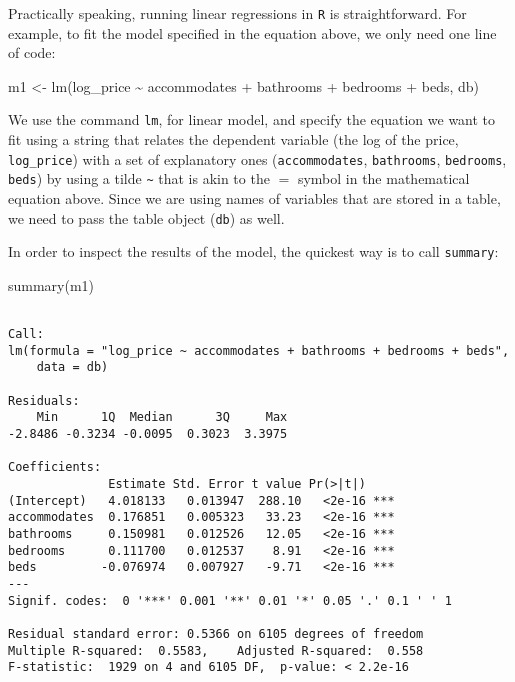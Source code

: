 \documentclass[
  letterpaper,
  krantz2]{style/krantz}
\newenvironment{Shaded}{\begin{snugshade}}{\end{snugshade}}
\newcommand{\FunctionTok}[1]{\textcolor[rgb]{0.28,0.35,0.67}{#1}}
\newcommand{\NormalTok}[1]{\textcolor[rgb]{0.00,0.23,0.31}{#1}}
\newcommand{\OtherTok}[1]{\textcolor[rgb]{0.00,0.23,0.31}{#1}}
\newcommand{\StringTok}[1]{\textcolor[rgb]{0.13,0.47,0.30}{#1}}
\begin{document}
Practically speaking, running linear regressions in \texttt{R} is
straightforward. For example, to fit the model specified in the equation
above, we only need one line of code:

\begin{Shaded}
\begin{Highlighting}[]
\NormalTok{m1 }\OtherTok{\textless{}{-}} \FunctionTok{lm}\NormalTok{(}\StringTok{\textquotesingle{}log\_price \textasciitilde{} accommodates + bathrooms + bedrooms + beds\textquotesingle{}}\NormalTok{, db)}
\end{Highlighting}
\end{Shaded}

We use the command \texttt{lm}, for linear model, and specify the
equation we want to fit using a string that relates the dependent
variable (the log of the price, \texttt{log\_price}) with a set of
explanatory ones (\texttt{accommodates}, \texttt{bathrooms},
\texttt{bedrooms}, \texttt{beds}) by using a tilde
\texttt{\textasciitilde{}} that is akin to the \(=\) symbol in the
mathematical equation above. Since we are using names of variables that
are stored in a table, we need to pass the table object (\texttt{db}) as
well.

In order to inspect the results of the model, the quickest way is to
call \texttt{summary}:

\begin{Shaded}
\begin{Highlighting}[]
\FunctionTok{summary}\NormalTok{(m1)}
\end{Highlighting}
\end{Shaded}

\begin{verbatim}

Call:
lm(formula = "log_price ~ accommodates + bathrooms + bedrooms + beds", 
    data = db)

Residuals:
    Min      1Q  Median      3Q     Max 
-2.8486 -0.3234 -0.0095  0.3023  3.3975 

Coefficients:
              Estimate Std. Error t value Pr(>|t|)    
(Intercept)   4.018133   0.013947  288.10   <2e-16 ***
accommodates  0.176851   0.005323   33.23   <2e-16 ***
bathrooms     0.150981   0.012526   12.05   <2e-16 ***
bedrooms      0.111700   0.012537    8.91   <2e-16 ***
beds         -0.076974   0.007927   -9.71   <2e-16 ***
---
Signif. codes:  0 '***' 0.001 '**' 0.01 '*' 0.05 '.' 0.1 ' ' 1

Residual standard error: 0.5366 on 6105 degrees of freedom
Multiple R-squared:  0.5583,    Adjusted R-squared:  0.558 
F-statistic:  1929 on 4 and 6105 DF,  p-value: < 2.2e-16
\end{verbatim}
\end{document}
